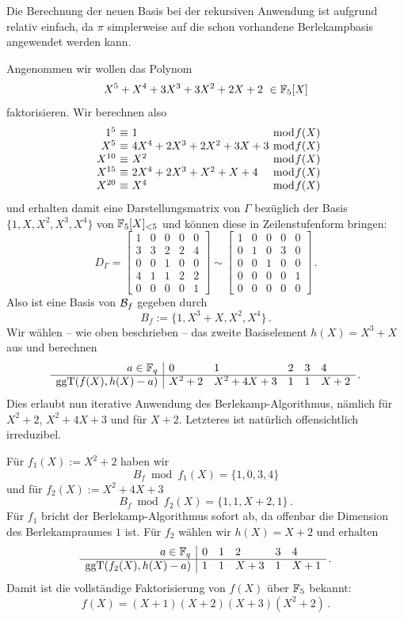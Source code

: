 
Die Berechnung der neuen Basis bei der rekursiven Anwendung ist aufgrund
 relativ einfach, da $\pi$ simplerweise auf die schon
vorhandene Berlekampbasis angewendet werden kann.

\begin{beispiel}
  Angenommen wir wollen das Polynom 
  \[ X^5 + X^4 + 3 X^3 + 3 X^2 + 2 X + 2 \ \in \mathbb{F}_5[X]\]
  faktorisieren. Wir berechnen also
  \[ \begin{array}{r@{\ \equiv\ }l@{\ \bmod f(X)}}
    1^5 & 1\\
    X^5 & 4X^4 + 2X^3 + 2 X^2+ 3X + 3\\
    X^{10} & X^2\\
    X^{15} & 2X^4 + 2X^3 + X^2 + X + 4\\
    X^{20} & X^4
  \end{array} \]
  und erhalten damit eine Darstellungsmatrix von $\Gamma$ bezüglich der Basis 
  $\{ 1, X, X^2, X^3, X^4\}$ von $\mathbb{F}_5[X]_{<5}$ und können diese in
  Zeilenstufenform bringen:
  \[ D_\Gamma = \begin{bmatrix}
      1& 0& 0& 0& 0\\ 
      3& 3& 2& 2& 4\\ 
      0& 0& 1& 0& 0\\ 
      4& 1& 1& 2& 2\\ 
      0& 0& 0& 0& 1\end{bmatrix} \sim 
      \begin{bmatrix}
      1& 0& 0& 0& 0\\ 
      0& 1& 0& 3& 0\\ 
      0& 0& 1& 0& 0\\ 
      0& 0& 0& 0& 1\\
      0& 0& 0& 0& 0\end{bmatrix}\,. \]
  Also ist eine Basis von $\mathcal{B}_f$ gegeben durch
  \[ B_f := \{ 1, X^3 +X, X^2, X^4\}\,.\]
  Wir wählen -- wie oben beschrieben -- das zweite Basiselement $h(X) = X^3 +X$
  aus und berechnen
  \[ \begin{array}{r|lllll}
      a\in \mathbb{F}_q & 0 & 1 & 2 & 3 & 4 \\\hline
      \operatorname{ggT}(f(X), h(X)-a) & X^2+2 & X^2+4X+3 & 1 & 1 & X+2\end{array}\,.\]
  Dies erlaubt nun iterative Anwendung des Berlekamp-Algorithmus, nämlich für 
  $X^2+2$, $X^2+4X+3$ und für $X+2$. Letzteres ist natürlich offensichtlich 
  irreduzibel.

  Für $f_1(X) := X^2+2$ haben wir 
  \[ B_f \bmod f_1(X) = \{ 1, 0, 3, 4\}\]
  und für $f_2(X) := X^2+4X+3$
  \[ B_f \bmod f_2(X) = \{1,1,X+2,1\}\,.\]
  Für $f_1$ bricht der Berlekamp-Algorithmus sofort ab, da offenbar die
  Dimension des Berlekampraumes $1$ ist.
  Für $f_2$ wählen wir $h(X) = X+2$ und erhalten 
  \[ \begin{array}{r|lllll}
      a\in \mathbb{F}_q & 0 & 1 & 2 & 3 & 4 \\\hline
      \operatorname{ggT}(f_2(X), h(X)-a) & 1 & 1 & X+3 & 1 & X+1\end{array}\,.\]
  Damit ist die vollständige Faktorisierung von $f(X)$ über $\mathbb{F}_5$ bekannt:
  \[ f(X) = (X+1)(X+2)(X+3)(X^2+2)\,.\]
\end{beispiel}


